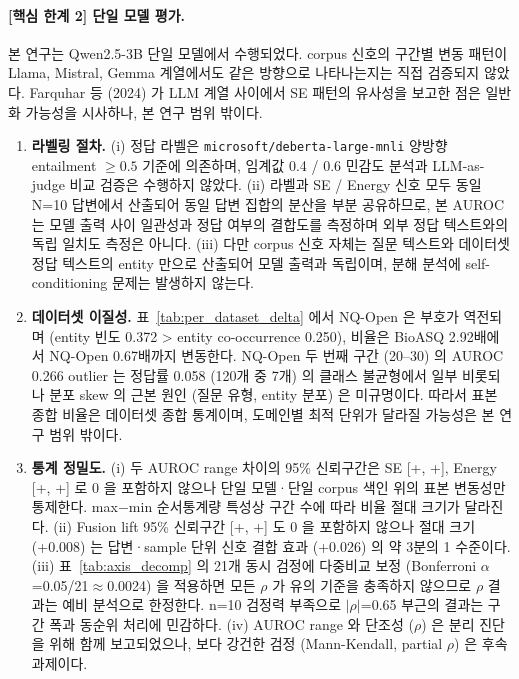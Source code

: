 \documentclass[oneside,ko,under]{snuthesis}
\begin{document}
\paragraph{[핵심 한계 2] 단일 모델 평가.}
본 연구는 Qwen2.5-3B 단일 모델에서 수행되었다. corpus 신호의 구간별 변동 패턴이 Llama, Mistral, Gemma 계열에서도 같은 방향으로 나타나는지는 직접 검증되지 않았다. Farquhar 등 (2024)\cite{farquhar2024} 가 LLM 계열 사이에서 SE 패턴의 유사성을 보고한 점은 일반화 가능성을 시사하나, 본 연구 범위 밖이다.

\begin{enumerate}
    \item \textbf{라벨링 절차.} (i) 정답 라벨은 \texttt{microsoft/deberta-large-mnli} 양방향 entailment $\geq 0.5$ 기준에 의존하며, 임계값 0.4 / 0.6 민감도 분석과 LLM-as-judge 비교 검증은 수행하지 않았다. (ii) 라벨과 SE / Energy 신호 모두 동일 N=10 답변에서 산출되어 동일 답변 집합의 분산을 부분 공유하므로, 본 AUROC 는 모델 출력 사이 일관성과 정답 여부의 결합도를 측정하며 외부 정답 텍스트와의 독립 일치도 측정은 아니다. (iii) 다만 corpus 신호 자체는 질문 텍스트와 데이터셋 정답 텍스트의 entity 만으로 산출되어 모델 출력과 독립이며, 분해 분석에 self-conditioning 문제는 발생하지 않는다.
    \item \textbf{데이터셋 이질성.} 표~\ref{tab:per_dataset_delta} 에서 NQ-Open 은 부호가 역전되며 (entity 빈도 0.372 > entity co-occurrence 0.250), 비율은 BioASQ 2.92배에서 NQ-Open 0.67배까지 변동한다. NQ-Open 두 번째 구간 (20--30) 의 AUROC 0.266 outlier 는 정답률 0.058 (120개 중 7개) 의 클래스 불균형에서 일부 비롯되나 분포 skew 의 근본 원인 (질문 유형, entity 분포) 은 미규명이다. 따라서 표본 종합 비율은 데이터셋 종합 통계이며, 도메인별 최적 단위가 달라질 가능성은 본 연구 범위 밖이다.
    \item \textbf{통계 정밀도.} (i) 두 AUROC range 차이의 95\% 신뢰구간은 SE [+\HeadlinePairMinusFreqSECIlow{}, +\HeadlinePairMinusFreqSECIhigh{}], Energy [+\HeadlinePairMinusFreqEnergyCIlow{}, +\HeadlinePairMinusFreqEnergyCIhigh{}] 로 0 을 포함하지 않으나 단일 모델·단일 corpus 색인 위의 표본 변동성만 통제한다. max$-$min 순서통계량 특성상 구간 수에 따라 비율 절대 크기가 달라진다. (ii) Fusion lift 95\% 신뢰구간 [+\HeadlineFusionLiftCIlow{}, +\HeadlineFusionLiftCIhigh{}] 도 0 을 포함하지 않으나 절대 크기 (+0.008) 는 답변·sample 단위 신호 결합 효과 (+0.026) 의 약 3분의 1 수준이다. (iii) 표~\ref{tab:axis_decomp} 의 21개 동시 검정에 다중비교 보정 (Bonferroni $\alpha$=0.05/21$\approx$0.0024) 을 적용하면 모든 $\rho$ 가 유의 기준을 충족하지 않으므로 $\rho$ 결과는 예비 분석으로 한정한다. n=10 검정력 부족으로 $|\rho|$=0.65 부근의 결과는 구간 폭과 동순위 처리에 민감하다. (iv) AUROC range 와 단조성 ($\rho$) 은 분리 진단을 위해 함께 보고되었으나, 보다 강건한 검정 (Mann-Kendall, partial $\rho$) 은 후속 과제이다.

\end{enumerate}
\end{document}
